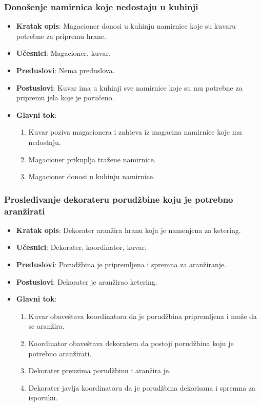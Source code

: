 \subsubsection{Donošenje namirnica koje nedostaju u kuhinji}
\begin{itemize}
    \item \textbf{Kratak opis}:
    Magacioner donosi u kuhinju namirnice koje su kuvaru potrebne za pripremu hrane.
    \item \textbf{Učesnici}:
    Magacioner, kuvar.
    \item \textbf{Preduslovi}:
    Nema preduslova.
    \item \textbf{Postuslovi}:
    Kuvar ima u kuhinji sve namirnice koje su mu potrebne za pripremu jela koje je poručeno.
    \item \textbf{Glavni tok}:
   \begin{enumerate}
        \item Kuvar poziva magacionera i zahteva iz magacina namirnice koje mu nedostaju.
        \item Magacioner prikuplja tražene namirnice.
        \item Magacioner donosi u kuhinju namirnice.
\end{enumerate}
\end{itemize}

\subsubsection{Prosleđivanje dekorateru porudžbine koju je potrebno aranžirati}
\begin{itemize}
    \item \textbf{Kratak opis}:
    Dekorater aranžira hranu koja je
    namenjena za ketering.
    \item \textbf{Učesnici}: 
    Dekorater, koordinator, kuvar.
    \item \textbf{Preduslovi}:
    Porudžbina je pripremljena i spremna
    za aranžiranje.
    \item \textbf{Postuslovi}:
    Dekorater je aranžirao ketering.
    \item \textbf{Glavni tok}:
   \begin{enumerate}
        \item Kuvar obaveštava koordinatora da
        je porudžbina pripremljena i može da 
        se aranžira.
        \item Koordinator obaveštava
        dekoratera da postoji porudžbina koju je potrebno aranžirati.
        \item Dekorater preuzima porudžbinu i aranžira je.
        \item Dekorater javlja koordinatoru da 
        je porudžbina dekorisana i spremna za isporuku.
\end{enumerate}
\end{itemize}


